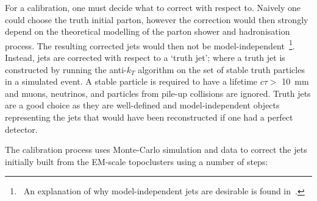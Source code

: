 For a calibration, one must decide what to correct with respect to.
Naively one could choose the truth initial parton,
however the correction would then strongly depend on the theoretical modelling of the parton shower and hadronisation process.
The resulting corrected jets would then not be model-independent~\footnote{\ An explanation of why model-independent jets are desirable is found in~\cite{theo-jets_jb}.}.
Instead, jets are corrected with respect to a `truth jet';
where a truth jet is constructed by running the anti-$k_T$ algorithm on the set of stable truth particles in a simulated event.
A stable particle is required to have a lifetime $c\tau >$ \SI{10}{\milli\metre} and muons, neutrinos, and particles from pile-up collisions are ignored.
Truth jets are a good choice as they are well-defined and model-independent objects representing the jets that would have been reconstructed if one had a perfect detector.

The calibration process uses Monte-Carlo simulation and data to correct the jets initially
built from the EM-scale topoclusters using a number of steps:

